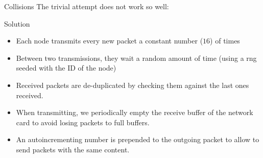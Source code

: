 \documentclass[italian]{beamer}
\newcommand{\no}{$\mathbin{\tikz [x=1.4ex,y=1.4ex,line width=.2ex, red] \draw (0,0) -- (1,1) (0,1) -- (1,0);}$}%
\begin{document}
\begin{frame}{Collisions}
    The trivial attempt does not work so well:
    \vspace{1cm}
    \begin{center}
    \end{center}
\end{frame}

\begin{frame}{Solution}
    \begin{itemize}
        \item<1-> Each node transmits every new packet a constant number ($16$) of times
        \item<2-> Between two transmissions, they wait a random amount of time (using
            a rng seeded with the ID of the node)
        \item<3-> Received packets are de-duplicated by checking them against the last
            ones received.
        \item<4-> When transmitting, we periodically empty the receive buffer of the
            network card to avoid losing packets to full buffers.
        \item<5-> An autoincrementing number is prepended to the outgoing packet
            to allow to send packets with the same content.
    \end{itemize}
\end{frame}
\end{document}
